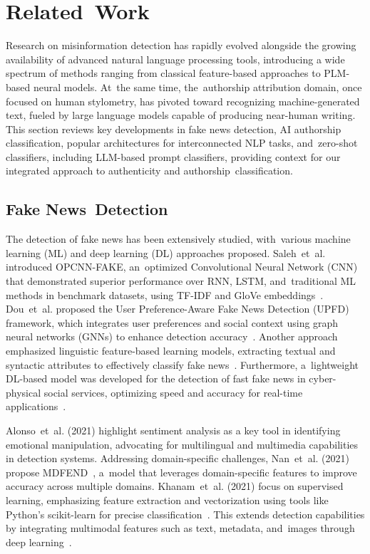 \documentclass[electronics,article,accept,pdftex,moreauthors,electronics]{Definitions/mdpi}
\begin{document}
\section{Related~Work}\label{S2}

Research on misinformation detection has rapidly evolved alongside the growing availability of advanced natural language processing tools, introducing a wide spectrum of methods ranging from classical feature-based approaches to PLM-based neural models. At~the same time, the~authorship attribution domain, once focused on human stylometry, has pivoted toward recognizing machine-generated text, fueled by large language models capable of producing near-human writing. This section reviews key developments in fake news detection, AI authorship classification, popular architectures for interconnected NLP tasks, and~zero-shot classifiers, including LLM-based prompt classifiers, providing context for our integrated approach to authenticity and authorship~classification.

\subsection{Fake News~Detection}

The detection of fake news has been extensively studied, with~various machine learning (ML) and deep learning (DL) approaches proposed. Saleh~et~al. introduced OPCNN-FAKE, an~optimized Convolutional Neural Network (CNN) that demonstrated superior performance over RNN, LSTM, and~traditional ML methods in benchmark datasets, using TF-IDF and GloVe embeddings~\cite{saleh_opcnn-fake_2021}. Dou~et~al. proposed the User Preference-Aware Fake News Detection (UPFD) framework, which integrates user preferences and social context using graph neural networks (GNNs) to enhance detection accuracy~\cite{dou_user_2021}. Another approach emphasized linguistic feature-based learning models, extracting textual and syntactic attributes to effectively classify fake news~\cite{choudhary_linguistic_2021}. Furthermore, a~lightweight DL-based model was developed for the detection of fast fake news in cyber-physical social services, optimizing speed and accuracy for real-time applications~\cite{zhang_deep_2023}.

Alonso~et~al. (2021) \cite{alonso_sentiment_2021} highlight sentiment analysis as a key tool in identifying emotional manipulation, advocating for multilingual and multimedia capabilities in detection systems. Addressing domain-specific challenges, Nan~et~al. (2021) propose MDFEND~\cite{nan_mdfend_2021}, a~model that leverages domain-specific features to improve accuracy across multiple domains. Khanam~et~al. (2021) focus on supervised learning, emphasizing feature extraction and vectorization using tools like Python’s scikit-learn for precise classification~\cite{khanam_fake_2021}. This extends detection capabilities by integrating multimodal features such as text, metadata, and~images through deep learning~\cite{sahoo_multiple_2021}.
\end{document}
